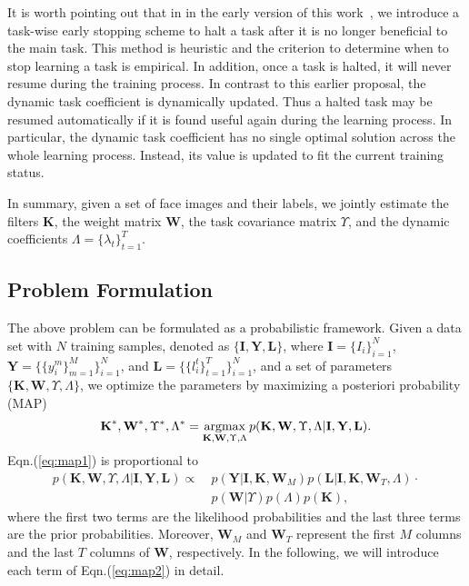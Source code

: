 \documentclass[10pt,journal,compsoc]{IEEEtran}
\newcommand{\W} {\textbf{W}}
\newcommand{\I} {\textbf{I}}
\newcommand{\K} {\textbf{K}}
\newcommand{\Y} {\textbf{Y}}
\newcommand{\LL} {\textbf{L}}
\begin{document}
It is worth pointing out that in in the early version of this work~\cite{zhang2014facial}, we introduce a task-wise early stopping scheme to halt a task after it is no longer beneficial to the main task. This method is heuristic and the criterion to determine when to stop learning a task is empirical. In addition, once a task is halted, it will never resume during the training process.
In contrast to this earlier proposal, the dynamic task coefficient is dynamically updated. Thus a halted task may be resumed automatically if it is found useful again during the learning process. In particular, the dynamic task coefficient has no single optimal solution across the whole learning process. Instead, its value is updated to fit the current training status.







In summary, given a set of face images and their labels, we jointly estimate the filters $\K$, the weight matrix $\W$, the task covariance matrix $\Upsilon$, and the dynamic coefficients $\Lambda=\{\lambda_t\}_{t=1}^T$.

\subsection{Problem Formulation}
\label{sec:problemformulation}

The above problem can be formulated as a probabilistic framework.
Given a data set with $N$ training samples, denoted as $\{\I,\Y,\LL\}$, where $\I=\{I_i\}_{i=1}^N$, $\Y=\{\{y^m_i\}_{m=1}^M\}_{i=1}^N$, and $\LL=\{\{l^t_i\}_{t=1}^T\}_{i=1}^N$, and a set of parameters $\{\K,\W,\Upsilon,\Lambda\}$, we optimize the parameters by maximizing a posteriori probability (MAP)
\begin{equation}\label{eq:map1}
\K^\ast,\W^\ast,\Upsilon^\ast,\Lambda^\ast=\argmax_{\K,\W,\Upsilon,\Lambda} p(\K,\W,\Upsilon,\Lambda|\I,\Y,\LL).
\end{equation}
Eqn.(\ref{eq:map1}) is proportional to
\begin{equation}\label{eq:map2}
\begin{split}
p(\K,\W,\Upsilon,\Lambda|\I,\Y,\LL)\propto~&p(\Y|\I,\K,\W_{M})p(\LL|\I,\K,\W_{T},\Lambda)\cdot\\
&p(\W|\Upsilon)p(\Lambda)p(\K),
\end{split}
\end{equation}
where the first two terms are the likelihood probabilities and the last three terms are the prior probabilities. Moreover, $\W_{M}$ and $\W_{T}$ represent the first $M$ columns and the last $T$ columns of $\W$, respectively. In the following, we will introduce each term of Eqn.(\ref{eq:map2}) in detail.
\end{document}
